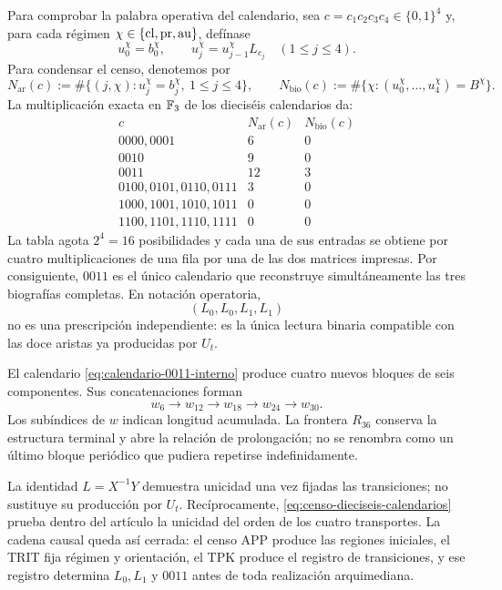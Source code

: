Para comprobar la palabra operativa del calendario, sea
\(c=c_1c_2c_3c_4\in\{0,1\}^4\) y, para cada régimen
\(\chi\in\{{\rm cl},{\rm pr},{\rm au}\}\), defínase
\[
 u_0^\chi=b_0^\chi,\qquad
 u_j^\chi=u_{j-1}^\chi L_{c_j}\quad(1\le j\le4).
\]
Para condensar el censo, denotemos por
\[
 N_{\mathrm{ar}}(c):=
 \#\{(j,\chi):u_j^\chi=b_j^\chi,\ 1\le j\le4\},\qquad
 N_{\mathrm{bio}}(c):=
 \#\{\chi:(u_0^\chi,\ldots,u_4^\chi)=B^\chi\}.
\]
La multiplicación exacta en \(\mathbb F_3\) de los dieciséis calendarios da:
\[
\begin{array}{c|c|c}
 c&N_{\mathrm{ar}}(c)&N_{\mathrm{bio}}(c)\\ \hline
0000,0001&6&0\\
0010&9&0\\
0011&12&3\\
0100,0101,0110,0111&3&0\\
1000,1001,1010,1011&0&0\\
1100,1101,1110,1111&0&0
\end{array}
\tag{D}
\label{eq:censo-dieciseis-calendarios}
\]
La tabla agota \(2^4=16\) posibilidades y cada una de sus entradas se obtiene
por cuatro multiplicaciones de una fila por una de las dos matrices impresas.
Por consiguiente, \(0011\) es el único calendario que reconstruye
simultáneamente las tres biografías completas. En notación operatoria,
\begin{equation}
 (L_0,L_0,L_1,L_1)
 \label{eq:calendario-0011-interno}
\end{equation}
no es una prescripción independiente: es la única lectura binaria compatible
con las doce aristas ya producidas por \(U_t\).

El calendario \eqref{eq:calendario-0011-interno} produce cuatro nuevos
bloques de seis componentes. Sus concatenaciones forman
\[
 w_6\longrightarrow w_{12}\longrightarrow w_{18}
 \longrightarrow w_{24}\longrightarrow w_{30}.
\]
Los subíndices de \(w\) indican longitud acumulada. La frontera \(R_{36}\) conserva la estructura terminal y abre la relación de prolongación; no se renombra como un último bloque periódico que pudiera repetirse indefinidamente.

La identidad \(L=X^{-1}Y\) demuestra unicidad una vez fijadas las
transiciones; no sustituye su producción por \(U_t\). Recíprocamente,
\eqref{eq:censo-dieciseis-calendarios} prueba dentro del artículo la unicidad
del orden de los cuatro transportes. La cadena causal queda así cerrada:
el censo APP produce las regiones iniciales, el TRIT fija régimen y
orientación, el TPK produce el registro de transiciones, y ese registro
determina \(L_0,L_1\) y \(0011\) antes de toda realización arquimediana.

